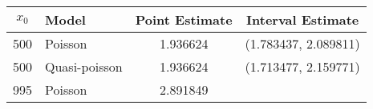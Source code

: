 \documentclass[12pt,]{article}
\begin{document}
\begin{longtable}[]{@{}clcc@{}}
\toprule
\begin{minipage}[b]{0.11\columnwidth}\centering\strut
\(x_0\)\strut
\end{minipage} & \begin{minipage}[b]{0.18\columnwidth}\raggedright\strut
Model\strut
\end{minipage} & \begin{minipage}[b]{0.21\columnwidth}\centering\strut
Point Estimate\strut
\end{minipage} & \begin{minipage}[b]{0.27\columnwidth}\centering\strut
Interval Estimate\strut
\end{minipage}\tabularnewline
\midrule
\endhead
\begin{minipage}[t]{0.11\columnwidth}\centering\strut
500\strut
\end{minipage} & \begin{minipage}[t]{0.18\columnwidth}\raggedright\strut
Poisson\strut
\end{minipage} & \begin{minipage}[t]{0.21\columnwidth}\centering\strut
1.936624\strut
\end{minipage} & \begin{minipage}[t]{0.27\columnwidth}\centering\strut
(1.783437, 2.089811)\strut
\end{minipage}\tabularnewline
\begin{minipage}[t]{0.11\columnwidth}\centering\strut
500\strut
\end{minipage} & \begin{minipage}[t]{0.18\columnwidth}\raggedright\strut
Quasi-poisson\strut
\end{minipage} & \begin{minipage}[t]{0.21\columnwidth}\centering\strut
1.936624\strut
\end{minipage} & \begin{minipage}[t]{0.27\columnwidth}\centering\strut
(1.713477, 2.159771)\strut
\end{minipage}\tabularnewline
\begin{minipage}[t]{0.11\columnwidth}\centering\strut
995\strut
\end{minipage} & \begin{minipage}[t]{0.18\columnwidth}\raggedright\strut
Poisson\strut
\end{minipage} & \begin{minipage}[t]{0.21\columnwidth}\centering\strut
2.891849\strut

\end{minipage}
\end{longtable}
\end{document}
